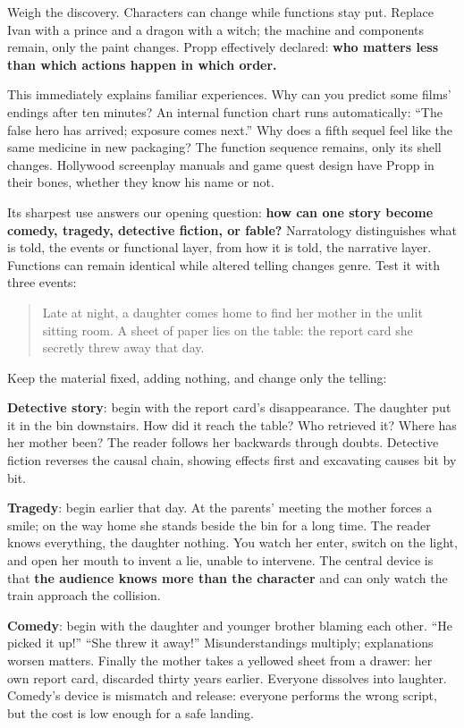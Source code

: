 Weigh the discovery. Characters can change while functions stay put. Replace Ivan with a prince and a dragon with a witch; the machine and components remain, only the paint changes. Propp effectively declared: \textbf{who matters less than which actions happen in which order.}

This immediately explains familiar experiences. Why can you predict some films' endings after ten minutes? An internal function chart runs automatically: ``The false hero has arrived; exposure comes next.'' Why does a fifth sequel feel like the same medicine in new packaging? The function sequence remains, only its shell changes. Hollywood screenplay manuals and game quest design have Propp in their bones, whether they know his name or not.

Its sharpest use answers our opening question: \textbf{how can one story become comedy, tragedy, detective fiction, or fable?} Narratology distinguishes what is told, the events or functional layer, from how it is told, the narrative layer. Functions can remain identical while altered telling changes genre. Test it with three events:

\begin{quote}
Late at night, a daughter comes home to find her mother in the unlit sitting room. A sheet of paper lies on the table: the report card she secretly threw away that day.
\end{quote}
Keep the material fixed, adding nothing, and change only the telling:

\textbf{Detective story}: begin with the report card's disappearance. The daughter put it in the bin downstairs. How did it reach the table? Who retrieved it? Where has her mother been? The reader follows her backwards through doubts. Detective fiction reverses the causal chain, showing effects first and excavating causes bit by bit.

\textbf{Tragedy}: begin earlier that day. At the parents' meeting the mother forces a smile; on the way home she stands beside the bin for a long time. The reader knows everything, the daughter nothing. You watch her enter, switch on the light, and open her mouth to invent a lie, unable to intervene. The central device is that \textbf{the audience knows more than the character} and can only watch the train approach the collision.

\textbf{Comedy}: begin with the daughter and younger brother blaming each other. ``He picked it up!'' ``She threw it away!'' Misunderstandings multiply; explanations worsen matters. Finally the mother takes a yellowed sheet from a drawer: her own report card, discarded thirty years earlier. Everyone dissolves into laughter. Comedy's device is mismatch and release: everyone performs the wrong script, but the cost is low enough for a safe landing.

